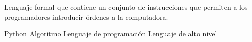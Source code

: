 
\question Lenguaje formal que contiene un conjunto de instrucciones que 
        permiten a los programadores introducir órdenes a la computadora.

  \begin{oneparchoices}
    \choice Python
    \choice Algoritmo
    \CorrectChoice Lenguaje de programación
    \choice Lenguaje de alto nivel
  \end{oneparchoices}
